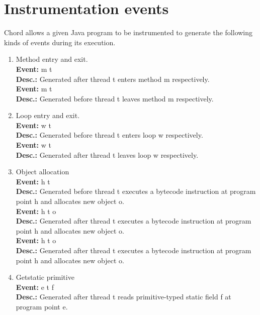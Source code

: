 \section{Instrumentation events}
\label{sec:instr-events}

Chord allows a given Java program to be instrumented to generate the
following kinds of events during its execution.

\begin{enumerate}
\item
Method entry and exit. \\
{\bf Event:}  m t \\
{\bf Desc.:} Generated after thread t enters method m respectively. \\
{\bf Event:}  m t \\
{\bf Desc.:} Generated before thread t leaves method m respectively.

\item
Loop entry and exit. \\
{\bf Event:}  w t \\
{\bf Desc.:} Generated before thread t enters loop w respectively. \\
{\bf Event:}  w t \\
{\bf Desc.:} Generated after thread t leaves loop w respectively.

\item
Object allocation \\
{\bf Event:}  h t \\
{\bf Desc.:} Generated before thread t executes a  bytecode instruction at program point h and allocates new object o. \\
{\bf Event:}  h t o \\
{\bf Desc.:} Generated after thread t executes a  bytecode instruction at program point h and allocates new object o. \\
{\bf Event:}  h t o \\
{\bf Desc.:} Generated after thread t executes a  bytecode instruction at program point h and allocates new object o.

\item
Getstatic primitive \\
{\bf Event:}  e t f \\
{\bf Desc.:} Generated after thread t reads primitive-typed static field f at program point e.


\end{enumerate}
